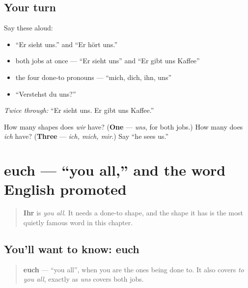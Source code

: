 \subsection*{Your turn}
Say these aloud:

\begin{itemize}
\raggedright
  \item \textquotedblleft{}Er sieht uns.\textquotedblright{} and \textquotedblleft{}Er hört uns.\textquotedblright{}
  \item both jobs at once — \textquotedblleft{}Er sieht uns\textquotedblright{} and \textquotedblleft{}Er gibt uns Kaffee\textquotedblright{}
  \item the four done-to pronouns — \textquotedblleft{}mich, dich, ihn, uns\textquotedblright{}
  \item \textquotedblleft{}Verstehst du uns?\textquotedblright{}
\end{itemize}

\emph{Twice through:} \textquotedblleft{}Er sieht uns. Er gibt uns Kaffee.\textquotedblright{}

\begin{tcolorbox}[breakable,colback=teal!4,colframe=teal!35!black,title={Before you move on}]
How many shapes does \emph{wir} have? (\textbf{One} — \emph{uns}, for both jobs.) How many does \emph{ich} have? (\textbf{Three} — \emph{ich, mich, mir}.) Say \textquotedblleft{}he sees us.\textquotedblright{}
\end{tcolorbox}
\section[euch]{euch — \textquotedblleft{}you all,\textquotedblright{} and the word English promoted}

\label{lesson:GE-C37-euch}



\begin{quote}
\textbf{Ihr} is \emph{you all}. It needs a done-to shape, and the shape it has is the most quietly famous word in this chapter.
\end{quote}

\subsection*{You'll want to know: euch}
\begin{quote}
\textbf{euch} — \textquotedblleft{}you all\textquotedblright{}, when you are the ones being done to. It also covers \emph{to you all}, exactly as \emph{uns} covers both jobs.
\end{quote}

